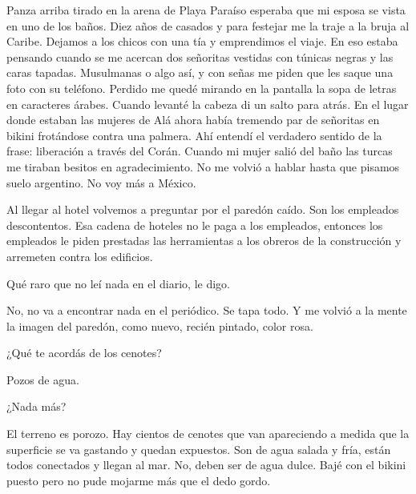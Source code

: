 \documentclass[12pt,twoside,openright,a5paper]{book}
\begin{document}
Panza arriba tirado en la arena de Playa Paraíso esperaba que mi esposa se
vista en uno de los baños. Diez años de casados y para festejar me la traje
a la bruja al Caribe. Dejamos a los chicos con una tía y emprendimos el
viaje. En eso estaba pensando cuando se me acercan dos señoritas vestidas
con túnicas negras y las caras tapadas. Musulmanas o algo así, y con
señas me piden que les saque una foto con su teléfono. Perdido me quedé
mirando en la pantalla la sopa de letras en caracteres árabes. Cuando levanté
la cabeza di un salto para atrás. En el lugar donde estaban las mujeres de
Alá ahora había tremendo par de señoritas en bikini frotándose contra
una palmera. Ahí entendí el verdadero sentido de la frase: liberación a
través del Corán. Cuando mi mujer salió del baño las turcas me tiraban
besitos en agradecimiento. No me volvió a hablar hasta que pisamos suelo
argentino. No voy más a México.


\vspace{0.5cm}
\hrulefill\hspace{0.2cm} \decofourleft\decofourright \hspace{0.2cm} \hrulefill
\vspace{0.5cm}

Al llegar al hotel volvemos a preguntar por el paredón caído. Son los
empleados descontentos. Esa cadena de hoteles no le paga a los empleados,
entonces los empleados le piden prestadas las herramientas a los obreros de
la construcción y arremeten contra los edificios.

Qué raro que no leí
nada en el diario, le digo.

No, no va a encontrar nada en el periódico. Se
tapa todo. Y me volvió a la mente la imagen del paredón, como nuevo,
recién pintado, color rosa.


\vspace{0.5cm}
\hrulefill\hspace{0.2cm} \decofourleft\decofourright \hspace{0.2cm} \hrulefill
\vspace{0.5cm}

¿Qué te acordás de los cenotes?

Pozos de agua.

¿Nada más?

El terreno es porozo. Hay cientos de cenotes que van apareciendo a medida
que la superficie se va gastando y quedan expuestos. Son de agua salada
y fría, están todos conectados y llegan al mar. No, deben ser de agua
dulce. Bajé con el bikini puesto pero no pude mojarme más que el dedo gordo.
\end{document}
